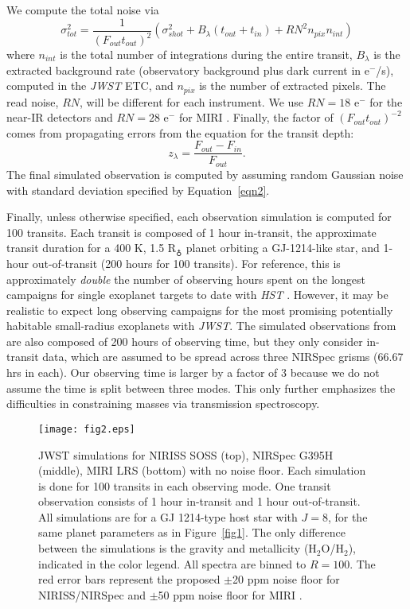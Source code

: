 \documentclass[iop]{emulateapj}
\begin{document}
We compute the total noise via
\begin{equation}
    \sigma_{tot}^2 = \frac{1}{(F_{out}t_{out})^2}(\sigma_{shot}^2 + B_\lambda (t_{out}+t_{in}) + RN^2 n_{pix} n_{int})
    \label{eqn2}
\end{equation}
where $n_{int}$ is the total number of integrations during the entire transit, $B_\lambda$ is the extracted background rate (observatory background plus dark current in e$^-$/s), computed in the \emph{JWST} ETC, and $n_{pix}$ is the number of extracted pixels. The read noise, $RN$, will be different for each instrument. We use $RN =18$ e$^-$ for the near-IR detectors and $RN=28$ e$^-$ for MIRI \citep{gre16}. Finally, the factor of $(F_{out}t_{out})^{-2}$ comes from propagating errors from the equation for the transit depth: 
\begin{equation}
z_\lambda = \frac{F_{out}-F_{in}}{F_{out}}.
\end{equation}
The final simulated observation is computed by assuming random Gaussian noise with standard deviation specified by Equation~\ref{eqn2}.  

Finally, unless otherwise specified, each observation simulation is computed for 100 transits. Each transit is composed of 1 hour in-transit, the approximate transit duration for a 400 K, 1.5 R$_\earth$ planet orbiting a GJ-1214-like star, and 1-hour out-of-transit (200 hours for 100 transits). For reference, this is approximately \emph{double} the number of observing hours spent on the longest campaigns for single exoplanet targets to date with \emph{HST} \citep{kre14, kre14b, ste14}.  However, it may be realistic to expect long observing campaigns for the most promising potentially habitable small-radius exoplanets with \emph{JWST}.  The simulated observations from \citet{dew13} are also composed of 200 hours of observing time, but they only consider in-transit data, which are assumed to be spread across three NIRSpec grisms (66.67 hrs in each).  Our observing time is larger by a factor of 3 because we do not assume the time is split between three modes. This only further emphasizes the difficulties in constraining masses via transmission spectroscopy. 

\begin{figure}[ht]
 \texttt{[image: fig2.eps]}
\caption{JWST simulations for NIRISS SOSS (top), NIRSpec G395H (middle), MIRI LRS (bottom) with no noise floor. Each simulation is done for 100 transits in each observing mode. One transit observation consists of 1 hour in-transit and 1 hour out-of-transit. All simulations are for a GJ 1214-type host star with $J=8$, for the same planet parameters as in Figure~\ref{fig1}. The only difference between the simulations is the gravity and metallicity (H$_2$O/H$_2$), indicated in the color legend. All spectra are binned to $R=100$. The red error bars represent the proposed $\pm$20 ppm noise floor for NIRISS/NIRSpec and $\pm$50 ppm noise floor for MIRI \citep{gre16}.  \label{fig2}}
\end{figure}
\end{document}
